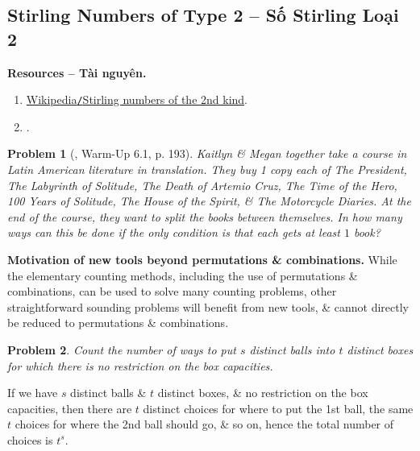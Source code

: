 \documentclass[oneside]{book}
\newtheorem{problem}{Problem}
\begin{document}

\subsection{Stirling Numbers of Type 2 -- Số Stirling Loại 2}
\textbf{\textsf{Resources -- Tài nguyên.}}
\begin{enumerate}
	\item \href{https://en.wikipedia.org/wiki/Stirling_numbers_of_the_second_kind}{Wikipedia{\tt/}Stirling numbers of the 2nd kind}.
	\item \cite{Ha_Thanh_to_hop}. 
\end{enumerate}

\begin{problem}[\cite{Shahriari2022}, Warm-Up 6.1, p. 193]
	{\sc Kaitlyn \& Megan} together take a course in Latin American literature in translation. They buy 1 copy each of {\rm The President, The Labyrinth of Solitude, The Death of Artemio Cruz, The Time of the Hero, 100 Years of Solitude, The House of the Spirit}, \& {\rm The Motorcycle Diaries}. At the end of the course, they want to split the books between themselves. In how many ways can this be done if the only condition is that each gets at least $1$ book?
\end{problem}
{\bf Motivation of new tools beyond permutations \& combinations.} While the elementary counting methods, including the use of permutations \& combinations, can be used to solve many counting problems, other straightforward sounding problems will benefit from new tools, \& cannot directly be reduced to permutations \& combinations.

\begin{problem}
	Count the number of ways to put $s$ distinct balls into $t$ distinct boxes for which there is no restriction on the box capacities.
\end{problem}

If we have $s$ distinct balls \& $t$ distinct boxes, \& no restriction on the box capacities, then there are $t$ distinct choices for where to put the 1st ball, the same $t$ choices for where the 2nd ball should go, \& so on, hence the total number of choices is $t^s$.
\end{document}
